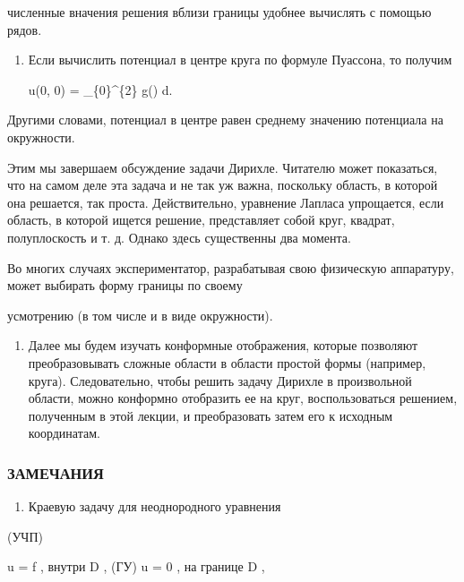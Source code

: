 \documentclass[
  ukrainian,
]{article}
\providecommand{\tightlist}{%
  \setlength{\itemsep}{0pt}\setlength{\parskip}{0pt}}
\begin{document}
численные вначения решения вблизи границы удобнее вычислять с помощью
рядов.

\begin{enumerate}
\def\labelenumi{\arabic{enumi}.}
\setcounter{enumi}{1}
\item
  Если вычислить потенциал в центре круга по формуле Пуассона, то
  получим

  u(0, 0) =  \int\_\{0\}\^{}\{2\pi\} g(\alpha) d\alpha.
\end{enumerate}

Другими словами, потенциал в центре равен среднему значению потенциала
на окружности.

Этим мы завершаем обсуждение задачи Дирихле. Читателю может показаться,
что на самом деле эта задача и не так уж важна, поскольку область, в
которой она решается, так проста. Действительно, уравнение Лапласа
упрощается, если область, в которой ищется решение, представляет собой
круг, квадрат, полуплоскость и т. д. Однако здесь существенны два
момента.

Во многих случаях экспериментатор, разрабатывая свою физическую
аппаратуру, может выбирать форму границы по своему

усмотрению (в том числе и в виде окружности).

\begin{enumerate}
\def\labelenumi{\arabic{enumi}.}
\setcounter{enumi}{1}
\tightlist
\item
  Далее мы будем изучать конформные отображения, которые позволяют
  преобразовывать сложные области в области простой формы (например,
  круга). Следовательно, чтобы решить задачу Дирихле в произвольной
  области, можно конформно отобразить ее на круг, воспользоваться
  решением, полученным в этой лекции, и преобразовать затем его к
  исходным координатам.
\end{enumerate}

\subsubsection{ЗАМЕЧАНИЯ}\label{ux437ux430ux43cux435ux447ux430ux43dux438ux44f-9}

\begin{enumerate}
\def\labelenumi{\arabic{enumi}.}
\tightlist
\item
  Краевую задачу для неоднородного уравнения
\end{enumerate}

(УЧП)

\Delta u = f , внутри D , (ГУ) u = 0 , на границе D ,
\end{document}
